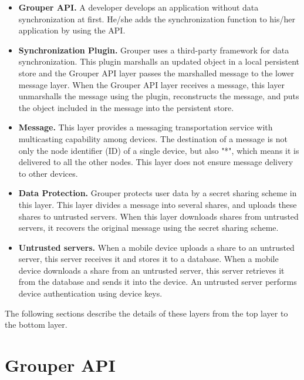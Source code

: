 \documentclass[a4paper,11pt]{report}
\begin{document}
\begin{itemize}[leftmargin=7mm]
	\setlength{\itemsep}{1pt}
	\setlength{\parskip}{0pt}
	\setlength{\parsep}{0pt}
	\item \textbf{Grouper API.}
	A developer develops an application without data synchronization at first. 
	He/she adds the synchronization function to his/her application by using the API.
	\item \textbf{Synchronization Plugin.} 
	Grouper uses a third-party framework for data synchronization.
	This plugin marshalls an updated object in a local persistent store and the Grouper API layer passes the marshalled message to the lower message layer.
	When the Grouper API layer receives a message, this layer unmarshalls the message using the plugin, reconstructs the message, and puts the object included in the message into the persistent store.
	\item \textbf{Message.}
	This layer provides a messaging transportation service with multicasting capability among devices.
	The destination of a message is not only the node identifier (ID) of a single device, but also "*", which means it is delivered to all the other nodes.
	This layer does not ensure message delivery to other devices.
	\item \textbf{Data Protection.}
	Grouper protects user data by a secret sharing scheme in this layer.
	This layer divides a message into several shares, and uploads these shares to untrusted servers.
	When this layer downloads shares from untrusted servers, it recovers the original message using the secret sharing scheme.
	\item \textbf{Untrusted servers.}
	When a mobile device uploads a share to an untrusted server, this server receives it and stores it to a database.
	When a mobile device downloads a share from an untrusted server, this server retrieves it from the database and sends it into the device.
	An untrusted server performs device authentication using device keys.
\end{itemize}

The following sections describe the details of these layers from the top layer to the bottom layer.

\section{Grouper API} \label{section:grouper_api}
\end{document}

